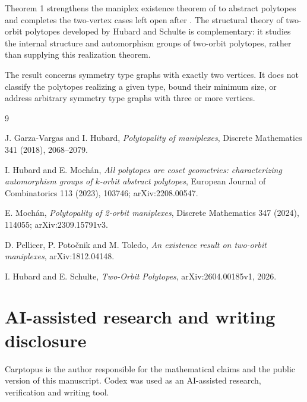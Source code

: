 \documentclass[11pt]{article}
\begin{document}
Theorem 1 strengthens the maniplex existence theorem of \cite{ppt2019} to abstract polytopes and completes the
two-vertex cases left open after \cite{mochan2024}. The structural theory of two-orbit polytopes developed by
Hubard and Schulte \cite{hs2026} is complementary: it studies the internal structure and automorphism groups
of two-orbit polytopes, rather than supplying this realization theorem.

The result concerns symmetry type graphs with exactly two vertices. It does not classify the
polytopes realizing a given type, bound their minimum size, or address arbitrary symmetry type
graphs with three or more vertices.


\begin{thebibliography}{9}

J. Garza-Vargas and I. Hubard,
\emph{Polytopality of maniplexes},
Discrete Mathematics 341 (2018), 2068--2079.

I. Hubard and E. Moch\'an,
\emph{All polytopes are coset geometries: characterizing automorphism groups of
$k$-orbit abstract polytopes},
European Journal of Combinatorics 113 (2023), 103746;
arXiv:2208.00547.

E. Moch\'an,
\emph{Polytopality of 2-orbit maniplexes},
Discrete Mathematics 347 (2024), 114055;
arXiv:2309.15791v3.

D. Pellicer, P. Poto\v{c}nik and M. Toledo,
\emph{An existence result on two-orbit maniplexes},
arXiv:1812.04148.

I. Hubard and E. Schulte,
\emph{Two-Orbit Polytopes},
arXiv:2604.00185v1, 2026.

\end{thebibliography}

\section*{AI-assisted research and writing disclosure}

Carptopus is the author responsible for the mathematical claims and the public version of this
manuscript. Codex was used as an AI-assisted research, verification and writing tool.
\end{document}
